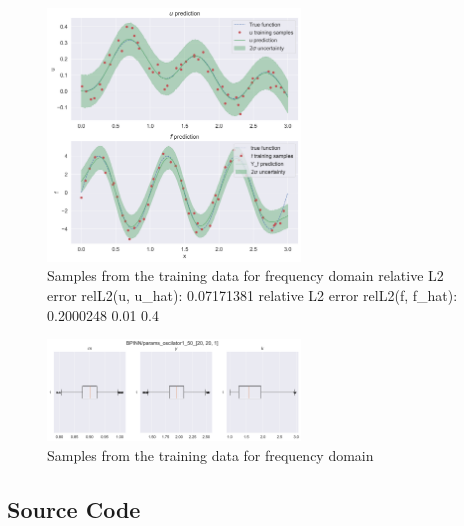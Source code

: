 \documentclass{article}
\begin{document}
\begin{figure}[htbp!]
    \centering
    \includegraphics[width=0.6\textwidth]{plots/BPINN/oscilator1_50_[20, 20, 1].png}
    \caption{Samples from the training data for frequency domain relative L2 error relL2(u, u_hat):  0.07171381
relative L2 error relL2(f, f_hat):  0.2000248 0.01 0.4}
    \label{fig:training_samples}
\end{figure}
\begin{figure}[htbp!]
    \centering
    \includegraphics[width=0.6\textwidth]{plots/BPINN/params_oscilator1_50_[20, 20, 1].png}
    \caption{Samples from the training data for frequency domain}
    \label{fig:training_samples}
\end{figure}
\newpage
\printbibliography
\newpage
\begin{appendices}
\section{Source Code}




\end{appendices}
\end{document}
